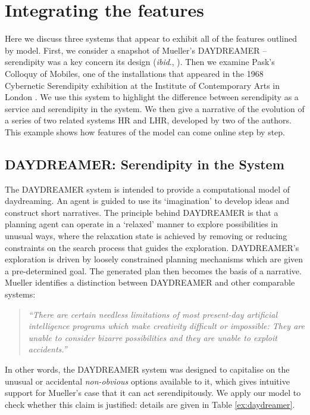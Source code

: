 \section{Integrating the features}\label{sec:system-analysis}

Here we discuss three systems that appear to exhibit all of the features outlined by model.  First, we consider a snapshot of Mueller's {\sf DAYDREAMER} \cite{mueller1990} -- serendipity was a key concern its design (\emph{ibid}., ).  Then we examine Pask's {\sf Colloquy of Mobiles}, one of the installations that appeared in the 1968 Cybernetic Serendipity exhibition at the Institute of Contemporary Arts in London
\cite{reichardt1969cybernetic}.  We use this system to highlight the difference between serendipity as a service and serendipity in the system.  We then give a narrative of the evolution of a series of two related systems {\sf HR} and {\sf LHR}, developed by two of the authors.  This example shows how features of the model can come online step by step.

\subsection{{\sf DAYDREAMER}: Serendipity in the System}
The {\sf DAYDREAMER} system \cite{mueller1990} is intended to provide a computational model of daydreaming.  An agent is guided to use its `imagination' to develop ideas and construct short narratives.  The principle behind {\sf DAYDREAMER} is that a planning agent can operate in a `relaxed' manner to explore possibilities in unusual ways, where the relaxation state is achieved by removing or reducing constraints on the search process that guides the exploration.  {\sf DAYDREAMER}'s exploration is driven by loosely constrained planning mechanisms which are given a pre-determined goal.
The generated plan then becomes the basis of a narrative.
Mueller identifies a distinction between {\sf DAYDREAMER} and other comparable systems:
\begin{quote}
\emph{``There are certain needless limitations of most present-day
  artificial intelligence programs which make creativity difficult or
  impossible: They are unable to consider bizarre possibilities and
  they are unable to exploit accidents.''} \cite[p. 14]{mueller1990}
\end{quote}
In other words, the {\sf DAYDREAMER} system was designed to capitalise
on the unusual or accidental {\em non-obvious} options available to
it, which gives intuitive support for Mueller's case that it can act
serendipitously.  We apply our model to check whether this claim is
justified: details are given in Table \ref{ex:daydreamer}.

